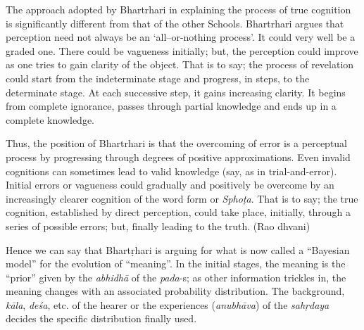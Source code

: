 \begin{myquote}
The approach adopted by Bhartrhari in explaining the process of true cognition is significantly different from that of the other Schools. Bhartrhari argues that perception need not always be an ‘all–or-nothing process’. It could very well be a graded one. There could be vagueness initially; but, the perception could improve as one tries to gain clarity of the object. That is to say; the process of revelation could start from the indeterminate stage and progress, in steps, to the determinate stage. At each successive step, it gains increasing clarity. It begins from complete ignorance, passes through partial knowledge and ends up in a complete knowledge.

Thus, the position of Bhartrhari is that the overcoming of error is a perceptual process by progressing through degrees of positive approximations. Even invalid cognitions can sometimes lead to valid knowledge (say, as in trial-and-error). Initial errors or vagueness could gradually and positively be overcome by an increasingly clearer cognition of the word form or \textsl{Sphoṭa}. That is to say; the true cognition, established by direct perception, could take place, initially, through a series of possible errors; but, finally leading to the truth. (Rao dhvani)
\end{myquote}

Hence we can say that Bhartṛhari is arguing for what is now called a “Bayesian model” for the evolution of “meaning”. In the initial stages, the meaning is the “prior” given by the \textsl{abhidhā} of the \textsl{pada}-s; as other information trickles in, the meaning changes with an associated probability distribution. The background, \textsl{kāla}, \textsl{deśa}, etc. of the hearer or the experiences (\textsl{anubhāva}) of the \textsl{sahṛdaya} decides the specific distribution finally used. 

